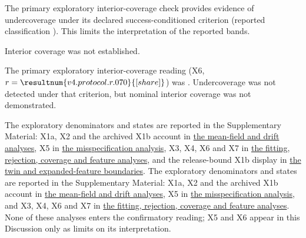 The primary exploratory interior-coverage check provides evidence of undercoverage under its declared success-conditioned criterion (reported classification \texttt{}). This limits the interpretation of the reported bands. %

Interior coverage was not established. %

The primary exploratory interior-coverage reading (X6, $r=\resultnum{v4.protocol.r.070}{[share]}$) was \texttt{}. Undercoverage was not detected under that criterion, but nominal interior coverage was not demonstrated. %

The exploratory denominators and states are reported in the Supplementary Material: X1a, X2 and the archived X1b account in \hyperref[supp:x1-x2]{the mean-field and drift analyses}, X5 in \hyperref[supp:x5]{the misspecification analysis}, X3, X4, X6 and X7 in \hyperref[supp:x3-x7]{the fitting, rejection, coverage and feature analyses}, and the release-bound X1b display in \hyperref[supp:x1b-release]{the twin and expanded-feature boundaries}. %
The exploratory denominators and states are reported in the Supplementary Material: X1a, X2 and the archived X1b account in \hyperref[supp:x1-x2]{the mean-field and drift analyses}, X5 in \hyperref[supp:x5]{the misspecification analysis}, and X3, X4, X6 and X7 in \hyperref[supp:x3-x7]{the fitting, rejection, coverage and feature analyses}. %
None of these analyses enters the confirmatory reading; X5 and X6 appear in this Discussion only as limits on its interpretation. %

